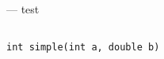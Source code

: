 \startmanpage
{}
--- test 
\startvb\begin{verbatim}

int simple(int a, double b)

\end{verbatim}
\endvb

\endmanpage
